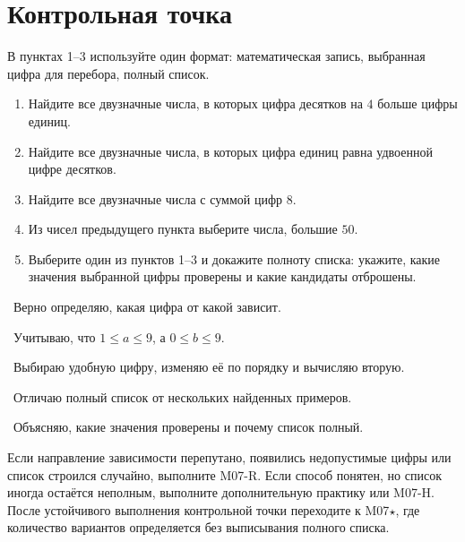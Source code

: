 \newpage
\section{Контрольная точка}

\begin{checkpointbox}
  В пунктах 1--3 используйте один формат: математическая запись, выбранная
  цифра для перебора, полный список.
  \begin{enumerate}[label=\textbf{\arabic*.}]
    \item Найдите все двузначные числа, в которых цифра десятков на \(4\)
      больше цифры единиц.
    \item Найдите все двузначные числа, в которых цифра единиц равна
      удвоенной цифре десятков.
    \item Найдите все двузначные числа с суммой цифр \(8\).
    \item Из чисел предыдущего пункта выберите числа, большие \(50\).
    \item Выберите один из пунктов 1--3 и докажите полноту списка: укажите,
      какие значения выбранной цифры проверены и какие кандидаты отброшены.
  \end{enumerate}
\end{checkpointbox}

\begin{reflectionbox}
  \choicebox\ Верно определяю, какая цифра от какой зависит.

  \choicebox\ Учитываю, что \(1\leq a\leq9\), а \(0\leq b\leq9\).

  \choicebox\ Выбираю удобную цифру, изменяю её по порядку и вычисляю вторую.

  \choicebox\ Отличаю полный список от нескольких найденных примеров.

  \choicebox\ Объясняю, какие значения проверены и почему список полный.
\end{reflectionbox}

\begin{notebox}
  Если направление зависимости перепутано, появились недопустимые цифры или
  список строился случайно, выполните M07-R. Если способ понятен, но список
  иногда остаётся неполным, выполните дополнительную практику или M07-H.
  После устойчивого выполнения контрольной точки переходите к M07\(\star\),
  где количество вариантов определяется без выписывания полного списка.
\end{notebox}
